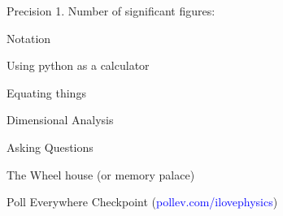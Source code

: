  \begin{frame}{Precision}
1. Number of significant figures:
%
%
%
%
%
%
%

\end{frame}
\begin{frame}{Notation}

\end{frame}

\begin{frame}{Using python as a calculator}

\end{frame}

\begin{frame}{Equating things}

\end{frame}

\begin{frame}{Dimensional Analysis}

\end{frame}

\begin{frame}{Asking Questions}

\end{frame}

\begin{frame}{The Wheel house (or memory palace)}

\end{frame}


\begin{frame}{Poll Everywhere Checkpoint (\textcolor{blue}{pollev.com/ilovephysics})}
\notsotiny

\end{frame}






 
